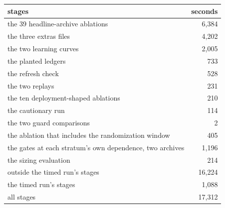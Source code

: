 \begin{tabular}{lr}
\toprule
stages & seconds \\
\midrule
the 39 headline-archive ablations & 6,384 \\
the three extras files & 4,202 \\
the two learning curves & 2,005 \\
the planted ledgers & 733 \\
the refresh check & 528 \\
the two replays & 231 \\
the ten deployment-shaped ablations & 210 \\
the cautionary run & 114 \\
the two guard comparisons & 2 \\
the ablation that includes the randomization window & 405 \\
the gates at each stratum's own dependence, two archives & 1,196 \\
the sizing evaluation & 214 \\
\midrule
outside the timed run's stages & 16,224 \\
the timed run's stages & 1,088 \\
\midrule
all stages & 17,312 \\
\bottomrule
\end{tabular}
